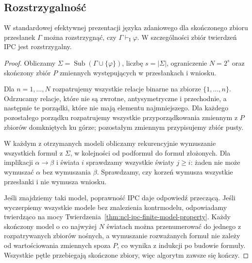 \subsection{Rozstrzygalność}

\begin{twierdzenie}
\label{thm:ncl-ipc-decidability}
W standardowej efektywnej prezentacji języka
zdaniowego dla skończonego zbioru przesłanek $\Gamma$
można rozstrzygnąć, czy
$\Gamma\vdash_{\mathrm I}\varphi$.
W szczególności zbiór twierdzeń IPC jest rozstrzygalny.
\end{twierdzenie}
\begin{proof}
Obliczamy $\Sigma=\operatorname{Sub}
(\Gamma\cup\{\varphi\})$, liczbę $s=|\Sigma|$,
ograniczenie $N=2^s$ oraz skończony zbiór $P$
zmiennych występujących w przesłankach i wniosku.

Dla $n=1,\ldots,N$ rozpatrujemy wszystkie relacje
binarne na zbiorze $\{1,\ldots,n\}$.
Odrzucamy relacje, które nie są zwrotne,
antysymetryczne i przechodnie, a następnie
te porządki, które nie mają elementu najmniejszego.
Dla każdego pozostałego porządku rozpatrujemy
wszystkie przyporządkowania zmiennym z $P$
zbiorów domkniętych ku górze; pozostałym zmiennym
przypisujemy zbiór pusty.

W każdym z otrzymanych modeli obliczamy rekurencyjnie
wymuszanie wszystkich formuł z $\Sigma$,
w kolejności od podformuł do formuł złożonych.
Dla implikacji $\alpha\to\beta$ i świata $i$
sprawdzamy wszystkie światy $j\geq i$:
żaden nie może wymuszać $\alpha$ bez wymuszania
$\beta$. Sprawdzamy, czy korzeń wymusza wszystkie
przesłanki i nie wymusza wniosku.

Jeśli znajdziemy taki model, poprawność IPC
daje odpowiedź przeczącą. Jeśli wyczerpiemy wszystkie
modele bez znalezienia kontrmodelu, odpowiadamy
twierdząco na mocy
Twierdzenia~\ref{thm:ncl-ipc-finite-model-property}.
Każdy skończony model o co najwyżej $N$ światach
można przenumerować do jednego z rozpatrywanych
zbiorów nośnych, a wymuszanie rozważanych formuł
nie zależy od wartościowania zmiennych spoza $P$,
co wynika z indukcji po budowie formuły.
Wszystkie pętle przebiegają skończone zbiory,
więc algorytm zawsze się kończy.
\end{proof}

